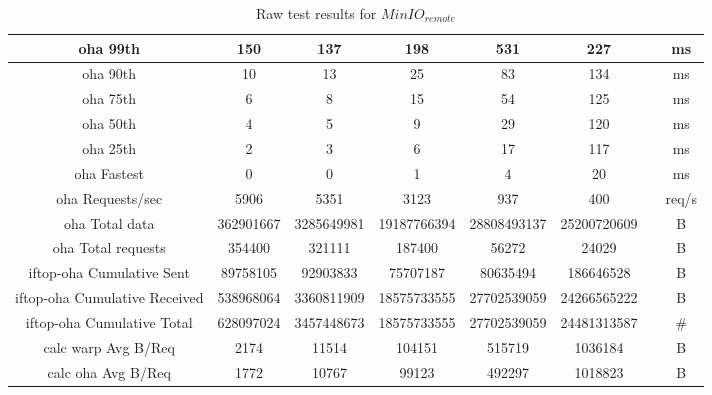 \begin{sidewaystable}
\begin{tabular}{|c|c|c|c|c|c|c|c|}
			\hline
			oha 99th & 150 & 137 & 198 & 531 & 227 &  & ms \\
			\hline
			oha 90th & 10 & 13 & 25 & 83 & 134 &  & ms \\
			\hline
			oha 75th & 6 & 8 & 15 & 54 & 125 &  & ms \\
			\hline
			oha 50th & 4 & 5 & 9 & 29 & 120 &  & ms \\
			\hline
			oha 25th & 2 & 3 & 6 & 17 & 117 &  & ms \\
			\hline
			oha Fastest & 0 & 0 & 1 & 4 & 20 &  & ms \\
			\hline
			oha Requests/sec & 5906 & 5351 & 3123 & 937 & 400 &  & req/s \\
			\hline
			oha Total data & 362901667 & 3285649981 & 19187766394 & 28808493137 & 25200720609 &  & B \\
			\hline
			oha Total requests & 354400 & 321111 & 187400 & 56272 & 24029 &  & B \\
			\hline
			iftop-oha Cumulative Sent & 89758105 & 92903833 & 75707187 & 80635494 & 186646528 &  & B \\
			\hline
			iftop-oha Cumulative Received & 538968064 & 3360811909 & 18575733555 & 27702539059 & 24266565222 &  & B \\
			\hline
			iftop-oha Cumulative Total & 628097024 & 3457448673 & 18575733555 & 27702539059 & 24481313587 &  & \# \\
			\hline
			calc warp Avg B/Req & 2174 & 11514 & 104151 & 515719 & 1036184 &  & B \\
			\hline
			calc oha Avg B/Req & 1772 & 10767 & 99123 & 492297 & 1018823 &  & B \\
			\hline
		\end{tabular}
	\caption{Raw test results for ${MinIO}_{remote}$}
\end{sidewaystable}

